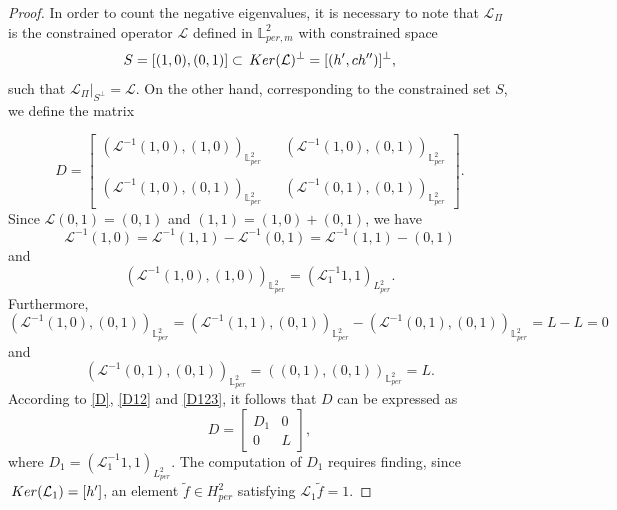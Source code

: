 \documentclass[10pt,a4paper]{amsart}
\newcommand{\Ker}{{\rm \,Ker}}
\begin{document}
\begin{proof}
	
	
In order to count the negative eigenvalues, it is necessary to note that $\mathcal{L}_{\Pi}$ is the constrained operator $\mathcal{L}$ defined in $\mathbb{L}_{per,m}^2$ with constrained space $$S= [(1,0),(0,1)] \subset \Ker(\mathcal{L})^{\perp}=[(h',ch'')]^\perp,$$ 
such that $\mathcal{L}_{\Pi}\big |_{S^\perp}=\mathcal{L}$. On the other hand, corresponding to the constrained set $S$, we define the matrix
 
 \begin{equation}\label{matrixD}
 	D=\left[\begin{array}{llll}(\mathcal{L}^{-1}(1,0),(1,0))_{\mathbb{L}^2_{per}}& & (\mathcal{L}^{-1}(1,0),(0,1))_{\mathbb{L}^2_{per}}\\\\
 		(\mathcal{L}^{-1}(1,0),(0,1))_{\mathbb{L}^2_{per}}& & (\mathcal{L}^{-1}(0,1),(0,1))_{\mathbb{L}^2_{per}}\end{array}\right].
 	\end{equation}
Since $\mathcal{L}(0,1)=(0,1)$ and $(1,1)=(1,0)+(0,1)$, we have $$\mathcal{L}^{-1}(1,0)=\mathcal{L}^{-1}(1,1)-\mathcal{L}^{-1}(0,1)=\mathcal{L}^{-1}(1,1)-(0,1)$$ and
 \begin{equation}\label{D}
\left( \mathcal{L}^{-1}(1,0), (1,0) \right)_{\mathbb{L}^2_{per}}%
= ( \mathcal{L}_1^{-1} 1,1)_{L^2_{per}}.%
\end{equation}
Furthermore,
\begin{equation}\label{D12}
		\left( \mathcal{L}^{-1}(1,0), (0,1) \right)_{\mathbb{L}^2_{per}}=\left(\mathcal{L}^{-1}(1,1),(0,1)\right)_{\mathbb{L}^2_{per}}-\left(\mathcal{L}^{-1}(0,1),(0,1)
		\right)_{\mathbb{L}^2_{per}}=L-L=0\end{equation}
and 
\begin{equation}\label{D123}
	\left( \mathcal{L}^{-1}(0,1), (0,1) \right)_{\mathbb{L}^2_{per}}=\left((0,1),(0,1)\right)_{\mathbb{L}^2_{per}}=L.\end{equation}
According to \eqref{D}, \eqref{D12} and \eqref{D123}, it follows that $D$ can be expressed as $$D=\left[\begin{array}{cc}D_1&  0\\
	0&  L\end{array}\right],$$ where $D_1=(\mathcal{L}_{1}^{-1}1,1)_{L_{per}^2}$. The computation of $D_1$ requires finding, since $\Ker(\mathcal{L}_1)=[h']$, an element $\tilde{f}\in H_{per}^2$ satisfying $\mathcal{L}_1\tilde{f}=1$. 
	

\end{proof}
\end{document}
